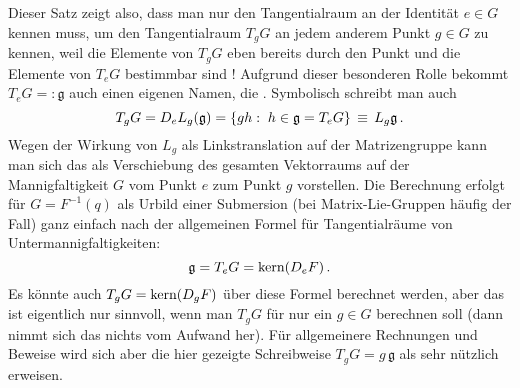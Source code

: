 \documentclass[../H_Analysis_main.tex]{subfiles}
\begin{document}

Dieser Satz zeigt also, dass man nur den Tangentialraum an der Identität $e \in G$ kennen muss, um den Tangentialraum $T_g G$ an jedem anderem Punkt $g \in G$ zu kennen, weil die Elemente von $T_g G$ eben bereits durch den Punkt und die Elemente von $T_e G$ bestimmbar sind ! Aufgrund dieser besonderen Rolle bekommt $T_e G =: \mathfrak{g}$ auch einen eigenen Namen, die . Symbolisch schreibt man auch
\begin{equation}
T_g G = D_e L_g (\mathfrak{g}) = \qty{gh: \; h \in \mathfrak{g} = T_e G} \, \equiv \, L_g \mathfrak{g} \, .
\end{equation}
Wegen der Wirkung von $L_g$ als Linkstranslation auf der Matrizengruppe kann man sich das als Verschiebung des gesamten Vektorraums auf der Mannigfaltigkeit $G$ vom Punkt $e$ zum Punkt $g$ vorstellen. Die Berechnung erfolgt für $G = F^{-1}(q)$ als Urbild einer Submersion (bei Matrix-Lie-Gruppen häufig der Fall) ganz einfach nach der allgemeinen Formel für Tangentialräume von Untermannigfaltigkeiten:
\begin{equation}
\mathfrak{g} = T_e G = \text{kern}\qty(D_e F) \, .
\end{equation}
Es könnte auch $T_g G = \text{kern}\qty(D_g F)$ über diese Formel berechnet werden, aber das ist eigentlich nur sinnvoll, wenn man $T_g G$ für nur ein $g \in G$ berechnen soll (dann nimmt sich das nichts vom Aufwand her). Für allgemeinere Rechnungen und Beweise wird sich aber die hier gezeigte Schreibweise $T_g G = g \, \mathfrak{g}$ als sehr nützlich erweisen.

\end{document}
